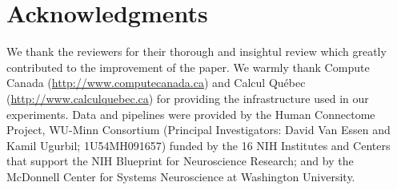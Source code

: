 \documentclass[a4paper,num-refs]{oup-contemporary}
\newcommand{\revised}[1]{\color{blue}#1\color{black}\xspace}
\newcommand{\tristan}[1]{\color{orange}\textbf{From Tristan:}#1\color{black}}
\begin{document}
\section{Acknowledgments}
\revised{We thank the reviewers for their thorough and insightul review which greatly contributed to the improvement 
of the paper.}
We warmly thank Compute Canada (\url{http://www.computecanada.ca}) and Calcul
Qu\'ebec (\url{http://www.calculquebec.ca}) for providing the infrastructure used in our experiments.
Data and pipelines were provided by the Human Connectome Project, WU-Minn
Consortium (Principal Investigators: David Van Essen and Kamil Ugurbil;
1U54MH091657) funded by the 16 NIH Institutes and Centers that support
the NIH Blueprint for Neuroscience Research; and by the McDonnell
Center for Systems Neuroscience at Washington University.






\end{document}

